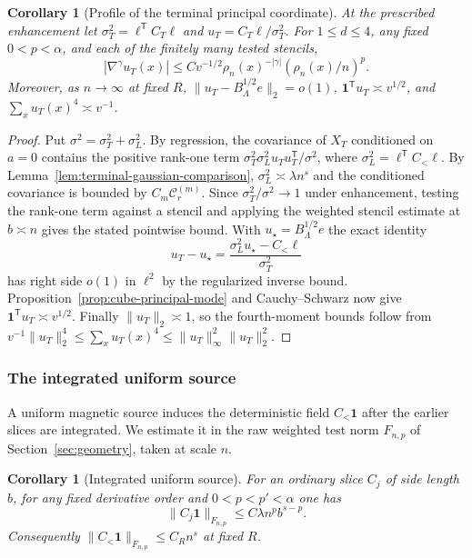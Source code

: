 \documentclass[11pt]{article}
\newtheorem{corollary}[theorem]{Corollary}
\theoremstyle{definition}
\newcommand{\one}{\mathbf 1}
\begin{document}
\begin{corollary}[Profile of the terminal principal coordinate]
\label{cor:terminal-principal-profile}
At the prescribed enhancement let \(\sigma_T^2=\ell^{\mathsf T}C_T\ell\)
and \(u_T=C_T\ell/\sigma_T^2\). For \(1\le d\le4\), any fixed
\(0<p<\alpha\), and each of the finitely many tested stencils,
\begin{equation}
 |\nabla^\gamma u_T(x)|\le C v^{-1/2}\rho_n(x)^{-|\gamma|}
                         (\rho_n(x)/n)^p .
\end{equation}
Moreover, as \(n\to\infty\) at fixed \(R\),
\(\|u_T-B_\Lambda^{1/2}e\|_2=o(1)\),
\(\one^{\mathsf T}u_T\asymp v^{1/2}\), and
\(\sum_x u_T(x)^4\asymp v^{-1}\).
\end{corollary}

\begin{proof}
Put \(\sigma^2=\sigma_T^2+\sigma_L^2\). By regression, the covariance
of \(X_T\) conditioned on \(a=0\) contains the positive rank-one term
\(\sigma_T^2\sigma_L^2 u_Tu_T^{\mathsf T}/\sigma^2\),
where \(\sigma_L^2=\ell^{\mathsf T} C_<\ell\).
By Lemma~\ref{lem:terminal-gaussian-comparison},
\(\sigma_L^2\asymp\lambda n^s\) and the conditioned covariance is
bounded by \(C_m\mathcal C_r^{(m)}\). Since
\(\sigma_T^2/\sigma^2\to1\) under enhancement, testing the rank-one
term against a stencil and applying the weighted stencil estimate
at \(b\asymp n\) gives the stated pointwise bound. With
\(u_\star=B_\Lambda^{1/2}e\) the exact identity
\begin{equation}
 u_T-u_\star=\frac{\sigma_L^2u_\star-C_<\ell}{\sigma_T^2}
\end{equation}
has right side \(o(1)\) in \(\ell^2\) by the regularized inverse
bound. Proposition~\ref{prop:cube-principal-mode} and
Cauchy--Schwarz now give \(\one^{\mathsf T}u_T\asymp v^{1/2}\).
Finally \(\|u_T\|_2\asymp1\), so the fourth-moment bounds follow
from \(v^{-1}\|u_T\|_2^4\le\sum_xu_T(x)^4\le
\|u_T\|_\infty^2\|u_T\|_2^2\).
\end{proof}

\subsubsection{The integrated uniform source}
A uniform magnetic source induces the deterministic field
\(C_<\one\) after the earlier slices are integrated. We estimate it
in the raw weighted test norm \(F_{n,p}\) of Section~\ref{sec:geometry},
taken at scale \(n\).

\begin{corollary}[Integrated uniform source]
\label{cor:integrated-uniform-source}
For an ordinary
slice \(C_j\) of side length \(b\), for any fixed derivative order
and \(0<p<p'<\alpha\) one has
\begin{equation}
 \|C_j\one\|_{F_{n,p}}\le C\lambda n^p b^{s-p}.
\end{equation}
Consequently \(\|C_<\one\|_{F_{n,p}}\le C_R n^s\) at fixed \(R\).
\end{corollary}
\end{document}
